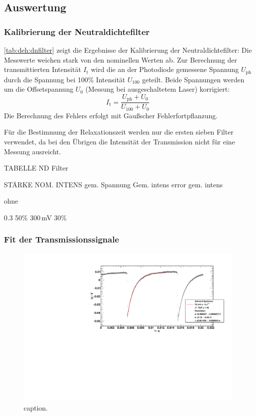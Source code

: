 \subsection{Auswertung}

\subsubsection*{Kalibrierung der Neutraldichtefilter}

\autoref{tab:deh:dnfilter} zeigt die Ergebnisse der Kalibrierung der Neutraldichtefilter:
Die Messwerte weichen stark von den nominellen Werten ab.
Zur Berechnung der transmittierten Intensität $I_\text{t}$ wird
die an der Photodiode gemessene Spannung $U_{\text{ph}}$
durch die Spannung bei 100\% Intensität $U_{100}$ geteilt.
Beide Spannungen werden um die Offsetspannung $U_{0}$ (Messung bei ausgeschaltetem Laser) korrigiert:
\begin{equation}
  I_\text{t}=\frac{U_{\text{ph}}+U_{0}}{U_{100}+U_{0}}
\end{equation}
Die Berechnung des Fehlers erfolgt mit Gaußscher Fehlerfortpflanzung.

Für die Bestimmung der Relaxationszeit werden nur die ersten sieben Filter verwendet,
da bei den Übrigen die Intensität der Transmission nicht für eine Messung ausreicht.




TABELLE ND Filter


STÄRKE		NOM. INTENS 	gem. Spannung		Gem. intens 	error gem. intens

ohne 

0.3	 			50\%			300\,mV				30\%


\subsubsection*{Fit der Transmissionssignale}

\begin{figure}[H]
\begin{center}
  \includegraphics[width=\textwidth]{../img/part5/65-5mA-10.pdf}
  \caption{caption.}
  \label{img:img:deh:trans3}
\end{center}
\end{figure}

